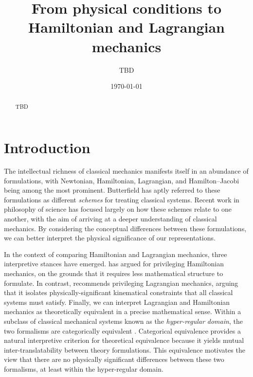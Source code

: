 \documentclass[letterpaper]{article}
\begin{document}
\title{From physical conditions to Hamiltonian and Lagrangian mechanics}
\author{TBD}

\date{\today}

\maketitle

\begin{abstract}
	TBD
\end{abstract}

\tableofcontents 


\section{Introduction}
\label{introduction}



The intellectual richness of classical mechanics manifests itself in an abundance of formulations, with Newtonian, Hamiltonian, Lagrangian, and Hamilton--Jacobi being among the most prominent.  Butterfield \parencites*[]{Butterfield2004} has aptly referred to these formulations as different \textit{schemes} for treating classical systems. Recent work in philosophy of science has focused largely on how these schemes relate to one another, with the aim of arriving at a deeper understanding of classical mechanics. By considering the conceptual differences between these formulations, we can better interpret the physical significance of our representations.

In the context of comparing Hamiltonian and Lagrangian mechanics, three interpretive stances have emerged. \textcites[]{North} has argued for privileging Hamiltonian mechanics, on the grounds that it requires less mathematical structure to formulate. In contrast, \textcites[]{Curiel} recommends privileging Lagrangian mechanics, arguing that it isolates physically-significant kinematical constraints that all classical systems must satisfy. Finally, we can interpret Lagrangian and Hamiltonian mechanics as theoretically equivalent in a precise mathematical sense. Within a subclass of classical mechanical systems known as the \textit{hyper-regular domain}, the two formalisms are categorically equivalent \parencites[]{Teh}{Barrett2}. Categorical equivalence provides a natural interpretive criterion for theoretical equivalence because it yields mutual inter-translatability between theory formulations. This equivalence motivates the view that there are no physically significant differences between these two formalisms, at least within the hyper-regular domain. 
\end{document}
